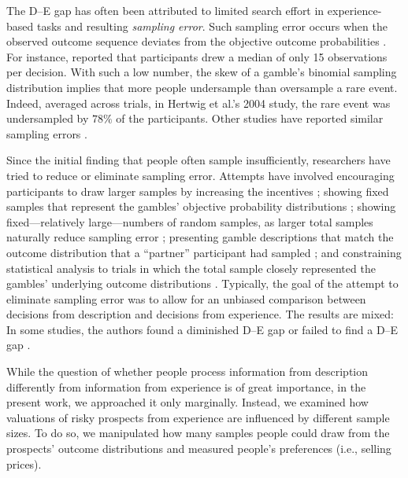 \documentclass[a4paper,man, natbib]{apa6} %
\begin{document}
The D--E gap has often been attributed to limited search effort in experience-based tasks and resulting \textit{sampling error}. Such sampling error occurs when the observed outcome sequence deviates from the objective outcome probabilities \citep{Hadar2009}. For instance, \cite{Hertwig2004} reported that participants drew a median of only 15 observations per decision. With such a low number, the skew of a gamble's binomial sampling distribution implies that more people undersample than oversample a rare event. Indeed, averaged across trials, in Hertwig et al.'s 2004 study, the rare event was undersampled by $78\%$ of the participants. Other studies have reported similar sampling errors \citep[e.g.,][]{Hau2008,Rakow2008}. 

Since the initial finding that people often sample insufficiently, researchers have tried to reduce or eliminate sampling error. Attempts have involved encouraging participants to draw larger samples by increasing the incentives \citep{Hau2008}; showing fixed samples that represent the gambles' objective probability distributions \citep{Ungemach2009}; showing fixed---relatively large---numbers of random samples, as larger total samples naturally reduce sampling error \citep{Hau2008,Hau2010}; presenting gamble descriptions that match the outcome distribution that a ``partner'' participant had sampled \citep{Rakow2008}; and constraining statistical analysis to trials in which the total sample closely represented the gambles' underlying outcome distributions \citep[e.g.,][]{Camilleri2009, Camilleri2011a}. Typically, the goal of the attempt to eliminate sampling error was to allow for an unbiased comparison between decisions from description and decisions from experience. The results are mixed: In some studies, the authors found a diminished D--E gap \citep{Hau2008,Hau2010, Ungemach2009} or failed to find a D--E gap \citep{Gloeckner2012, Camilleri2009,Camilleri2011a,Rakow2008}. 

While the question of whether people process information from description differently from information from experience is of great importance, in the present work, we approached it only marginally. Instead, we examined how valuations of risky prospects from experience are influenced by different sample sizes. To do so, we manipulated how many samples people could draw from the prospects' outcome distributions and measured people's preferences (i.e., selling prices).
\end{document}
